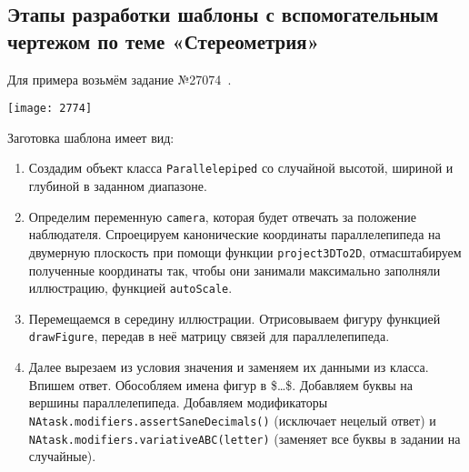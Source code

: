 \subsection{Этапы разработки шаблоны с вспомогательным чертежом по теме «Стереометрия»}

Для примера возьмём задание №27074~\cite{sdamgia}.

\texttt{[image: 2774]}

Заготовка шаблона имеет вид:



\begin{enumerate}
	\item Создадим объект класса \texttt{Parallelepiped} со случайной высотой, шириной и глубиной в заданном диапазоне. 
	
	\item Определим переменную \texttt{camera}, которая будет отвечать за положение наблюдателя. Спроецируем канонические координаты параллелепипеда на двумерную плоскость при помощи функции \texttt{project3DTo2D}, отмасштабируем полученные координаты так, чтобы они занимали максимально заполняли иллюстрацию, функцией \texttt{autoScale}.
	
	\item Перемещаемся в середину иллюстрации. Отрисовываем фигуру функцией \texttt{drawFigure}, передав в неё матрицу связей для параллелепипеда. 
	
	\item Далее вырезаем из условия значения и заменяем их данными из класса. Впишем ответ. Обособляем имена фигур в \$\dots\$. Добавляем буквы на вершины параллелепипеда. Добавляем модификаторы  \\        \texttt{NAtask.modifiers.assertSaneDecimals()} (исключает нецелый ответ) и
	\texttt{NAtask.modifiers.variativeABC(letter)} (заменяет все буквы в задании на случайные).
	
\end{enumerate}
